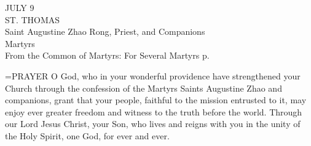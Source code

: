 \begin{center}\normalsize JULY 9\\
\footnotesize ST. THOMAS\\
\footnotesize Saint Augustine Zhao Rong, Priest, and Companions\\
\footnotesize Martyrs\\
\footnotesize From the Common of Martyrs: For Several Martyrs p.\\
\end{center}

\hangindent=\parindent \small{PRAYER 
O God, who in your wonderful providence
have strengthened your Church
through the confession of the Martyrs
Saints Augustine Zhao and companions,
grant that your people,
faithful to the mission entrusted to it,
may enjoy ever greater freedom
and witness to the truth before the world.
Through our Lord Jesus Christ, your Son,
who lives and reigns with you in the unity of the Holy Spirit,
one God, for ever and ever.\\}
 
